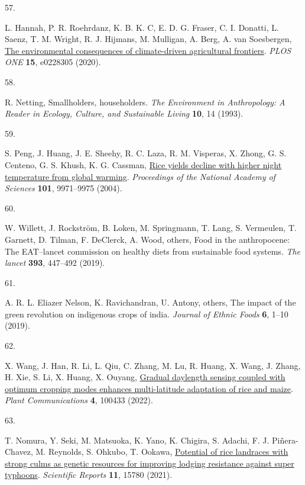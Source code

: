 \documentclass[
  letterpaper,
  DIV=11,
  numbers=noendperiod]{scrartcl}
\newlength{\cslhangindent}
\newlength{\csllabelwidth}
\newenvironment{CSLReferences}[2] %
 {\begin{list}{}{%
  \setlength{\itemindent}{0pt}
  \setlength{\leftmargin}{0pt}
  \setlength{\parsep}{0pt}
  \ifodd #1
   \setlength{\leftmargin}{\cslhangindent}
   \setlength{\itemindent}{-1\cslhangindent}
  \fi
  \setlength{\itemsep}{#2\baselineskip}}}
 {\end{list}}
\newcommand{\CSLLeftMargin}[1]{\parbox[t]{\csllabelwidth}{\strut#1\strut}}
\newcommand{\CSLRightInline}[1]{\parbox[t]{\linewidth - \csllabelwidth}{\strut#1\strut}}
\begin{document}
\begin{CSLReferences}{0}{1}
\CSLLeftMargin{57. }%
\CSLRightInline{L. Hannah, P. R. Roehrdanz, K. B. K. C, E. D. G. Fraser,
C. I. Donatti, L. Saenz, T. M. Wright, R. J. Hijmans, M. Mulligan, A.
Berg, A. van Soesbergen,
\href{https://doi.org/10.1371/journal.pone.0228305}{The environmental
consequences of climate-driven agricultural frontiers}. \emph{PLOS ONE}
\textbf{15}, e0228305 (2020).}

\CSLLeftMargin{58. }%
\CSLRightInline{R. Netting, Smallholders, householders. \emph{The
Environment in Anthropology: A Reader in Ecology, Culture, and
Sustainable Living} \textbf{10}, 14 (1993).}

\CSLLeftMargin{59. }%
\CSLRightInline{S. Peng, J. Huang, J. E. Sheehy, R. C. Laza, R. M.
Visperas, X. Zhong, G. S. Centeno, G. S. Khush, K. G. Cassman,
\href{https://doi.org/10.1073/pnas.0403720101}{Rice yields decline with
higher night temperature from global warming}. \emph{Proceedings of the
National Academy of Sciences} \textbf{101}, 9971--9975 (2004).}

\CSLLeftMargin{60. }%
\CSLRightInline{W. Willett, J. Rockström, B. Loken, M. Springmann, T.
Lang, S. Vermeulen, T. Garnett, D. Tilman, F. DeClerck, A. Wood, others,
Food in the anthropocene: The EAT--lancet commission on healthy diets
from sustainable food systems. \emph{The lancet} \textbf{393}, 447--492
(2019).}

\CSLLeftMargin{61. }%
\CSLRightInline{A. R. L. Eliazer Nelson, K. Ravichandran, U. Antony,
others, The impact of the green revolution on indigenous crops of india.
\emph{Journal of Ethnic Foods} \textbf{6}, 1--10 (2019).}

\CSLLeftMargin{62. }%
\CSLRightInline{X. Wang, J. Han, R. Li, L. Qiu, C. Zhang, M. Lu, R.
Huang, X. Wang, J. Zhang, H. Xie, S. Li, X. Huang, X. Ouyang,
\href{https://doi.org/10.1016/j.xplc.2022.100433}{Gradual daylength
sensing coupled with optimum cropping modes enhances multi-latitude
adaptation of rice and maize}. \emph{Plant Communications} \textbf{4},
100433 (2022).}

\CSLLeftMargin{63. }%
\CSLRightInline{T. Nomura, Y. Seki, M. Matsuoka, K. Yano, K. Chigira, S.
Adachi, F. J. Piñera-Chavez, M. Reynolds, S. Ohkubo, T. Ookawa,
\href{https://doi.org/10.1038/s41598-021-95268-0}{Potential of rice
landraces with strong culms as genetic resources for improving lodging
resistance against super typhoons}. \emph{Scientific Reports}
\textbf{11}, 15780 (2021).}


\end{CSLReferences}
\end{document}
